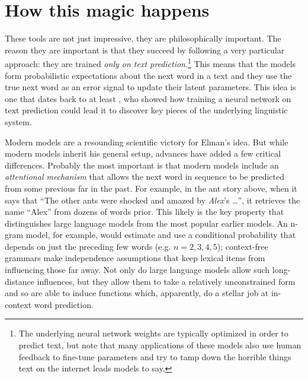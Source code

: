 \documentclass[output=paper,colorlinks,citecolor=brown]{langscibook}
\begin{document}
\section{How this magic happens}

These tools are not just impressive, they are philosophically important. The reason they are important is that they succeed by following a very particular approach: they are trained \textit{only on text prediction}.\footnote{The underlying neural network weights are typically optimized in order to predict text, but note that many applications of these models also use human feedback to fine-tune parameters and try to tamp down the horrible things text on the internet leads models to say.} This means that the models form probabilistic expectations about the next word in a text and they use the true next word as an error signal to update their latent parameters. This idea is one that dates back to at least \citet{elman1990finding}, who showed how training a neural network on text prediction could lead it to discover key pieces of the underlying linguistic system. 

Modern models are a resounding scientific victory for Elman's idea. But while modern models inherit his general setup, advances have added a few critical differences. Probably the most important is that modern models include an \textit{attentional mechanism} that allows the next word in sequence to be predicted from some previous far in the past. For example, in the ant story above,  when it says that ``The other ants were shocked and amazed by \textit{Alex}'s \ldots'', it retrieves the name ``Alex'' from dozens of words prior. This likely is the key property that distinguishes large language models from the most popular earlier models. An {n}-gram model, for example, would estimate and use a conditional probability that depends on just the preceding few words (e.g. $n=2,3,4,5$); context-free grammars make independence assumptions that keep lexical items from influencing those far away. Not only do large language models allow such long-distance influences, but they allow them to take a relatively unconstrained form and so are able to induce functions which, apparently, do a stellar job at in-context word prediction. 
\end{document}
